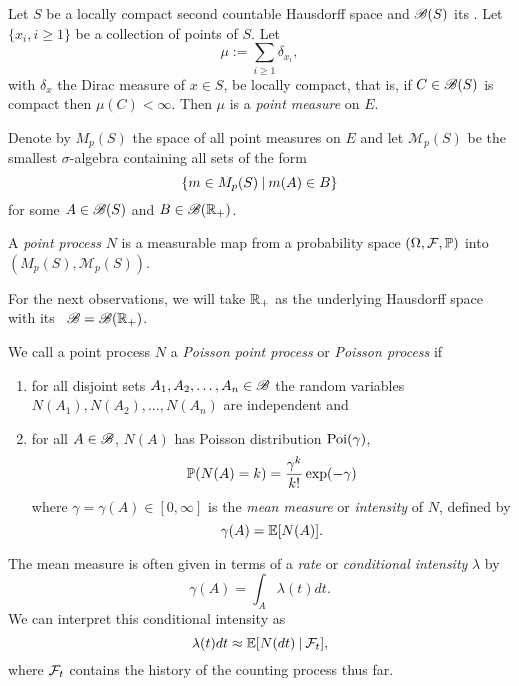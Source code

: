 \begin{definition} \label{D: point process}
	Let $S$ be a locally compact second countable Hausdorff space
	and $\mathscr{B}(S)$ its \Bosi.
	Let $\{x_i, i \geq 1\}$ be a collection of points of $S$.
	Let
	\begin{equation}
		\mu := \sum_{i \geq 1} \delta_{x_i},
	\end{equation}
	with $\delta_x$ the Dirac measure of $x \in S$,
	be locally compact, that is, 
	if $C \in \mathscr{B}(S)$ is compact then $\mu(C) < \infty$.
	Then $\mu$ is a \emph{point measure} on $E$.
	
	Denote by $M_p(S)$ the space of all point measures on $E$
	and let $\mathscr{M}_p(S)$ be the smallest $\sigma$-algebra containing all sets of the form
	\begin{equation*}
		\{ m \in M_p(S) \: | \: m(A) \in B \}
	\end{equation*}
	for some $A \in \mathscr{B}(S)$ and $B \in \mathscr{B}(\mathbb{R}_+)$.
	
	A \emph{point process} $N$ is a measurable map from a probability space
	$(\Omega, \mathcal{F}, \mathbb{P})$ into $(M_p(S), \mathscr{M}_p(S))$.
\end{definition}

\bigskip

For the next observations, we will take $\mathbb{R}_+$ as the underlying Hausdorff space with its \Bosi~$\mathscr{B} = \mathscr{B}(\mathbb{R}_+)$.

\begin{definition} \label{D: poisson process}
	We call a point process $N$ a \emph{Poisson point process} or \emph{Poisson process}
	if
	\begin{enumerate}
		\item for all disjoint sets $A_1, A_2, \dots, A_n \in \mathscr{B}$
			the random variables $N(A_1), N(A_2), \dots, N(A_n)$ are independent and
		\item for all $A \in \mathscr{B}$, $N(A)$ has Poisson distribution $\operatorname*{Poi}(\gamma)$,
			\begin{equation*}
				\mathbb{P}(N(A) = k) = \frac{\gamma^k}{k!}\exp(-\gamma)
			\end{equation*}
			where $\gamma = \gamma(A) \in [0, \infty]$ is the \emph{mean measure} or \emph{intensity} of $N$,
			defined by
			\begin{equation}
				\gamma(A) = \mathbb{E}[ N(A) ].
			\end{equation}
	\end{enumerate}
	The mean measure is often given in terms of a \emph{rate} or \emph{conditional intensity} $\lambda$ by
	\begin{equation} \label{D: def gamma(A)}
		\gamma(A) = \int_A \lambda(t)dt.
	\end{equation}
	We can interpret this conditional intensity as
	\begin{equation}
		\lambda(t)dt \approx \mathbb{E}[ N(dt) \: | \: \mathcal{F}_{t} ] ,
	\end{equation}
	where $\mathcal{F}_{t}$ contains the history of the counting process thus far.
\end{definition}

